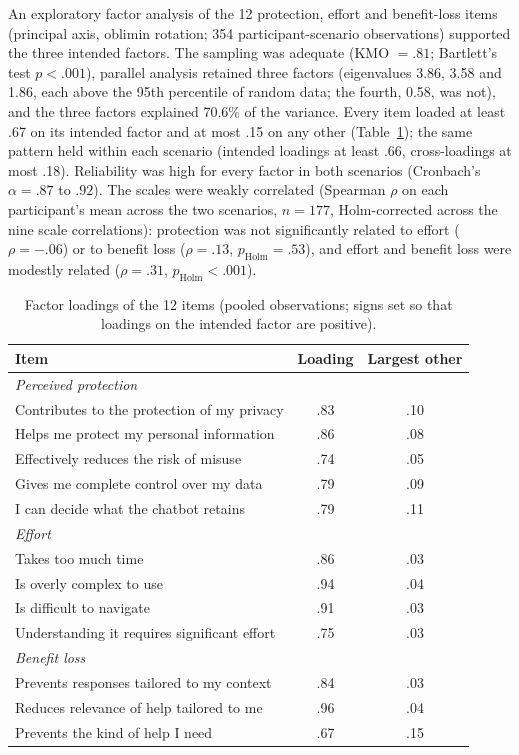 \documentclass[conference,compsoc]{IEEEtran}
\begin{document}
An exploratory factor analysis of the 12 protection, effort and benefit-loss items (principal axis, oblimin rotation; 354 participant-scenario observations) supported the three intended factors. The sampling was adequate (KMO $=.81$; Bartlett's test $p<.001$), parallel analysis retained three factors (eigenvalues 3.86, 3.58 and 1.86, each above the 95th percentile of random data; the fourth, 0.58, was not), and the three factors explained 70.6\% of the variance. Every item loaded at least .67 on its intended factor and at most .15 on any other (Table~\ref{tab:efa}); the same pattern held within each scenario (intended loadings at least .66, cross-loadings at most .18). Reliability was high for every factor in both scenarios (Cronbach's $\alpha=.87$ to $.92$). The scales were weakly correlated (Spearman $\rho$ on each participant's mean
across the two scenarios, $n=177$, Holm-corrected across the nine scale
correlations): protection was not significantly related to effort
($\rho=-.06$) or to benefit loss ($\rho=.13$, $p_{\mathrm{Holm}}=.53$), and
effort and benefit loss were modestly related ($\rho=.31$,
$p_{\mathrm{Holm}}<.001$).

\begin{table}[t]
\centering
\caption{Factor loadings of the 12 items (pooled observations; signs set so that loadings on the intended factor are positive).}
\label{tab:efa}
\small
\setlength{\tabcolsep}{3pt}
\begin{tabular}{p{}cc}
\toprule
Item & Loading & Largest other \\
\midrule
\multicolumn{3}{l}{\textit{Perceived protection}} \\
Contributes to the protection of my privacy & .83 & .10 \\
Helps me protect my personal information & .86 & .08 \\
Effectively reduces the risk of misuse & .74 & .05 \\
Gives me complete control over my data & .79 & .09 \\
I can decide what the chatbot retains & .79 & .11 \\
\midrule
\multicolumn{3}{l}{\textit{Effort}} \\
Takes too much time & .86 & .03 \\
Is overly complex to use & .94 & .04 \\
Is difficult to navigate & .91 & .03 \\
Understanding it requires significant effort & .75 & .03 \\
\midrule
\multicolumn{3}{l}{\textit{Benefit loss}} \\
Prevents responses tailored to my context & .84 & .03 \\
Reduces relevance of help tailored to me & .96 & .04 \\
Prevents the kind of help I need & .67 & .15 \\
\bottomrule
\end{tabular}
\end{table}
\end{document}
